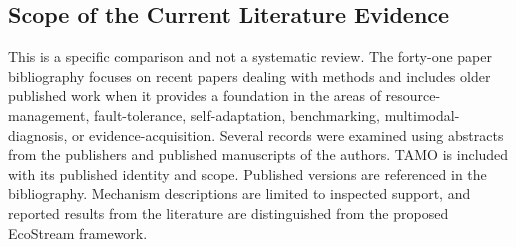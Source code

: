 \subsection{Scope of the Current Literature Evidence}
This is a specific comparison and not a systematic review. The forty-one paper bibliography focuses on recent papers dealing with methods and includes older published work when it provides a foundation in the areas of resource-management, fault-tolerance, self-adaptation, benchmarking, multimodal-diagnosis, or evidence-acquisition. Several records were examined using abstracts from the publishers and published manuscripts of the authors. TAMO is included with its published identity and scope. Published versions are referenced in the bibliography. Mechanism descriptions are limited to inspected support, and reported results from the literature are distinguished from the proposed EcoStream framework.
